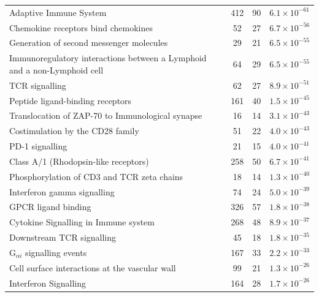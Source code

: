 \begin{table}[!hp]
{\begin{threeparttable}
\begin{tabular}{lccc}
  \hline
  \rowcolor{Cluster_Orange!30}
  Adaptive Immune System & 412 &  90 & $6.1 \times 10^{-61}$ \\
  \rowcolor{Cluster_Orange!20} 
  Chemokine receptors bind chemokines &  52 &  27 & $6.7 \times 10^{-56}$ \\
  \rowcolor{Cluster_Orange!30} 
  Generation of second messenger molecules &  29 &  21 & $6.5 \times 10^{-55}$ \\
  \rowcolor{Cluster_Orange!20} 
  Immunoregulatory interactions between a Lymphoid and a non-Lymphoid cell &  64 &  29 & $6.5 \times 10^{-55}$ \\
  \rowcolor{Cluster_Orange!30} 
  TCR signalling &  62 &  27 & $8.9 \times 10^{-51}$ \\
  \rowcolor{Cluster_Orange!20} 
  Peptide ligand-binding receptors & 161 &  40 & $1.5 \times 10^{-45}$ \\
  \rowcolor{Cluster_Orange!30} 
  Translocation of ZAP-70 to Immunological synapse &  16 &  14 & $3.1 \times 10^{-43}$ \\
  \rowcolor{Cluster_Orange!20} 
  Costimulation by the CD28 family &  51 &  22 & $4.0 \times 10^{-43}$ \\
  \rowcolor{Cluster_Orange!30} 
  PD-1 signalling &  21 &  15 & $4.0 \times 10^{-41}$ \\
  \rowcolor{Cluster_Orange!20} 
  Class A/1 (Rhodopsin-like receptors) & 258 &  50 & $6.7 \times 10^{-41}$ \\
  \rowcolor{Cluster_Orange!30} 
  Phosphorylation of CD3 and TCR zeta chains &  18 &  14 & $1.3 \times 10^{-40}$ \\
  \rowcolor{Cluster_Orange!20} 
  Interferon gamma signalling &  74 &  24 & $5.0 \times 10^{-39}$ \\
  \rowcolor{Cluster_Orange!30} 
  GPCR ligand binding & 326 &  57 & $1.8 \times 10^{-38}$ \\
  \rowcolor{Cluster_Orange!20} 
  Cytokine Signalling in Immune system & 268 &  48 & $8.9 \times 10^{-37}$ \\
  \rowcolor{Cluster_Orange!30} 
  Downstream TCR signalling &  45 &  18 & $1.8 \times 10^{-35}$ \\
  \rowcolor{Cluster_Orange!20} 
  G$_{\alpha i}$ signalling events & 167 &  33 & $2.2 \times 10^{-33}$ \\
  \rowcolor{Cluster_Orange!30} 
  Cell surface interactions at the vascular wall &  99 &  21 & $1.3 \times 10^{-26}$ \\
  \rowcolor{Cluster_Orange!20} 
  Interferon Signalling & 164 &  28 & $1.7 \times 10^{-26}$ \\

\end{tabular}
\end{threeparttable}}
\end{table}
